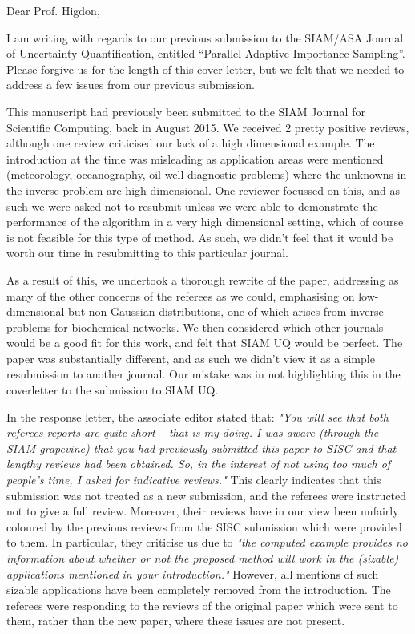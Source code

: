 \documentclass{letter}
\begin{document}
\date{}
\begin{letter}{ }

\opening{Dear Prof. Higdon,}

I am writing with regards to our previous submission to the SIAM/ASA Journal of Uncertainty Quantification, entitled ``Parallel Adaptive Importance Sampling''. Please forgive us for the length of this cover letter, but we felt that we needed to address a few issues from our previous submission.

This manuscript had previously been submitted to the SIAM Journal for Scientific Computing, back in August 2015. We received 2 pretty positive reviews, although one review criticised our lack of a high dimensional example. The introduction at the time was misleading as application areas were mentioned (meteorology, oceanography, oil well diagnostic problems) where the unknowns in the inverse problem are high dimensional. One reviewer focussed on this, and as such we were asked not to resubmit unless we were able to demonstrate the performance of the algorithm in a very high dimensional setting, which of course is not feasible for this type of method. As such, we didn't feel that it would be worth our time in resubmitting to this particular journal.

As a result of this, we undertook a thorough rewrite of the paper, addressing as many of the other concerns of the referees as we could, emphasising on low-dimensional but non-Gaussian distributions, one of which arises from inverse problems for biochemical networks. We then considered which other journals would be a good fit for this work, and felt that SIAM UQ would be perfect. The paper was substantially different, and as such we didn't view it as a simple resubmission to another journal. Our mistake was in not highlighting this in the coverletter to the submission to SIAM UQ.

In the response letter, the associate editor stated that: \emph{"You will see that both referees reports are quite short -- that is my doing. I was aware (through the SIAM grapevine) that you had previously submitted this paper to SISC and that lengthy reviews had been obtained. So, in the interest of not using too much of people's time, I asked for indicative reviews."} This clearly indicates that this submission was not treated as a new submission, and the referees were instructed not to give a full review. Moreover, their reviews have in our view been unfairly coloured by the previous reviews from the SISC submission which were provided to them. In particular, they criticise us due to \emph{"the computed example provides no information about whether or not the proposed method will work in the (sizable) applications mentioned in your introduction."} However, all mentions of such sizable applications have been completely removed from the introduction. The referees were responding to the reviews of the original paper which were sent to them, rather than the new paper, where these issues are not present.


\end{letter}
\end{document}
